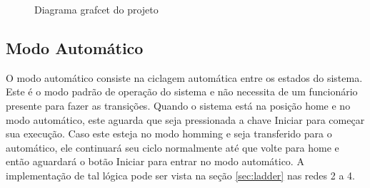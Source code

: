 \documentclass[twoside,twocolumn, 12pt]{paper}
\begin{document}
	\begin{figure}[t]
		\centering
		\caption{Diagrama grafcet do projeto}
		\label{fig:grafcet}
	\end{figure}
	
	\subsection{Modo Automático}
	O modo automático consiste na ciclagem automática entre os estados do sistema. Este é o modo padrão de operação do sistema e não necessita de um funcionário presente para fazer as transições. Quando o sistema está na posição home e no modo automático, este aguarda que seja pressionada a chave Iniciar para começar sua execução. Caso este esteja no modo homming e seja transferido para o automático, ele continuará seu ciclo normalmente até que volte para home e então aguardará o botão Iniciar para entrar no modo automático. A implementação de tal lógica pode ser vista na seção \ref{sec:ladder} nas redes 2 a 4. 
	
\end{document}
